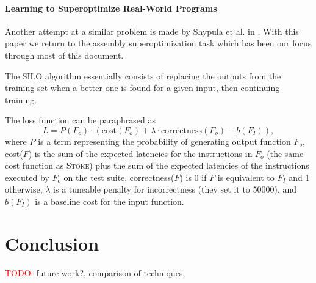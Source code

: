 \documentclass[12pt,twoside]{reedthesis}
\newcommand{\red}[1]{\textcolor{red}{#1}}
\begin{document}
\subsubsection{Learning to Superoptimize Real-World Programs}
Another attempt at a similar problem is made by Shypula et al. in \cite{shypula2022learning}.
With this paper we return to the assembly superoptimization task which has been our focus through most of this document. 

The SILO algorithm essentially consists of replacing the outputs from the training set when a better one is found for a given input, then continuing training.

The loss function can be paraphrased as 
\[ L = P(F_o) \cdot (\text{cost}(F_o) + \lambda \cdot \text{correctness}(F_o) - b(F_I)), \]
where $P$ is a term representing the probability of generating output function $F_o$, cost($F$) is the sum of the expected latencies for the instructions in $F_o$ (the same cost function as \textsc{Stoke}) plus the sum of the expected latencies of the instructions executed by $F_o$ on the test suite, correctness($F$) is 0 if $F$ is equivalent to $F_I$ and 1 otherwise, $\lambda$ is a tuneable penalty for incorrectness (they set it to 50000), and $b(F_I)$ is a baseline cost for the input function.


\chapter{Conclusion}
\red{TODO:} future work?, comparison of techniques, 



\backmatter


\end{document}
